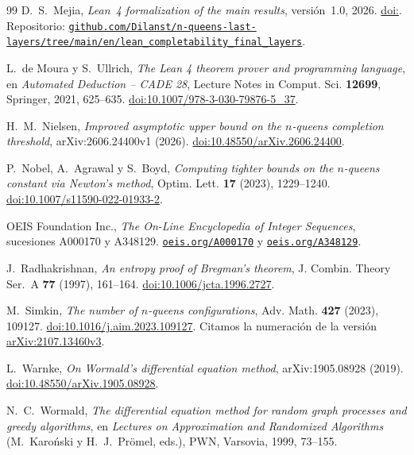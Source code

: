 \begin{thebibliography}{99}
\ifverificacionLean
{} D.~S.~Mejia, \emph{Lean~4 formalization of the main results}, versión~1.0, 2026.
\ifx\DOIcodigoLean\empty\else\href{https://doi.org/\DOIcodigoLean}{doi:\DOIcodigoLean}. \fi
Repositorio:
\href{https://github.com/Dilanst/n-queens-last-layers/tree/main/en/lean_completability_final_layers}%
{\nolinkurl{github.com/Dilanst/n-queens-last-layers/tree/main/en/lean_completability_final_layers}}.
\fi

\ifverificacionLean
{} L.~de Moura y S.~Ullrich, \emph{The Lean 4 theorem prover and programming
language}, en \emph{Automated Deduction -- CADE 28}, Lecture Notes in Comput. Sci.
\textbf{12699}, Springer, 2021, 625--635.
\href{https://doi.org/10.1007/978-3-030-79876-5_37}{doi:10.1007/978-3-030-79876-5\_37}.
\fi

 H.~M.~Nielsen,
\emph{Improved asymptotic upper bound on the $n$-queens completion threshold}, arXiv:2606.24400v1 (2026).
\href{https://doi.org/10.48550/arXiv.2606.24400}{doi:10.48550/arXiv.2606.24400}.

 P.~Nobel, A.~Agrawal y S.~Boyd, \emph{Computing tighter bounds on the $n$-queens
constant via Newton's method}, Optim. Lett. \textbf{17} (2023), 1229--1240.
\href{https://doi.org/10.1007/s11590-022-01933-2}{doi:10.1007/s11590-022-01933-2}.

 OEIS Foundation Inc., \emph{The On-Line Encyclopedia of Integer Sequences}, sucesiones
A000170 y A348129. \href{https://oeis.org/A000170}{\nolinkurl{oeis.org/A000170}} y
\href{https://oeis.org/A348129}{\nolinkurl{oeis.org/A348129}}.

 J.~Radhakrishnan, \emph{An entropy proof of Bregman's theorem}, J. Combin.
Theory Ser.~A \textbf{77} (1997), 161--164.
\href{https://doi.org/10.1006/jcta.1996.2727}{doi:10.1006/jcta.1996.2727}.

 M.~Simkin, \emph{The number of $n$-queens configurations}, Adv. Math.
\textbf{427} (2023), 109127.
\href{https://doi.org/10.1016/j.aim.2023.109127}{doi:10.1016/j.aim.2023.109127}.
Citamos la numeración de la versión
\href{https://arxiv.org/abs/2107.13460v3}{arXiv:2107.13460v3}.

 L.~Warnke, \emph{On Wormald's differential equation method}, arXiv:1905.08928 (2019).
\href{https://doi.org/10.48550/arXiv.1905.08928}{doi:10.48550/arXiv.1905.08928}.

 N.~C.~Wormald, \emph{The differential equation method for random graph processes and
greedy algorithms}, en \emph{Lectures on Approximation and Randomized Algorithms}
(M.~Karoński y H.~J.~Prömel, eds.), PWN, Varsovia, 1999, 73--155.

\end{thebibliography}

